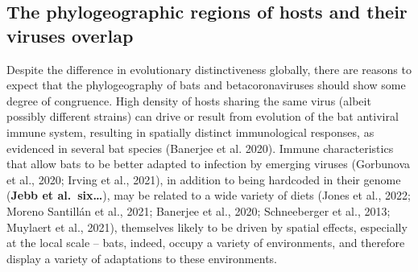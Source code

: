 \documentclass[11pt]{article}
\begin{document}
\hypertarget{the-phylogeographic-regions-of-hosts-and-their-viruses-overlap}{%
\subsection{The phylogeographic regions of hosts and their viruses
overlap}\label{the-phylogeographic-regions-of-hosts-and-their-viruses-overlap}}

Despite the difference in evolutionary distinctiveness globally, there
are reasons to expect that the phylogeography of bats and
betacoronaviruses should show some degree of congruence. High density of
hosts sharing the same virus (albeit possibly different strains) can
drive or result from evolution of the bat antiviral immune system,
resulting in spatially distinct immunological responses, as evidenced in
several bat species (Banerjee et al. 2020). Immune characteristics that
allow bats to be better adapted to infection by emerging viruses
(Gorbunova et al., 2020; Irving et al., 2021), in addition to being
hardcoded in their genome (\textbf{Jebb et al.~six\ldots{}}), may be
related to a wide variety of diets (Jones et al., 2022; Moreno Santillán
et al., 2021; Banerjee et al., 2020; Schneeberger et al., 2013; Muylaert
et al., 2021), themselves likely to be driven by spatial effects,
especially at the local scale -- bats, indeed, occupy a variety of
environments, and therefore display a variety of adaptations to these
environments.
\end{document}
